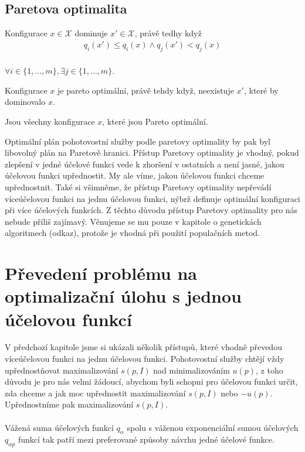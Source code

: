 \subsection{Paretova optimalita}

\begin{definice}[Dominance]
  Konfigurace $x \in \mathcal{X}$ dominuje $x' \in \mathcal{X}$, právě tedhy když
  \begin{align*}
    q_i(x') \leq q_i(x) \land q_j(x') < q_j(x)
  \end{align*}
  \\
$\forall i \in \{ 1, \dots, m \}, \exists j \in \{ 1, \dots, m \}$.
\\
\end{definice}

\begin{definice}
  Konfigurace $x$ je pareto optimální, právě tehdy když, neexistuje $x'$, které by dominovalo $x$.
  \\
\end{definice}

\begin{definice}
  Jsou všechny konfigurace $x$, které jsou Pareto optimální.
  \\
\end{definice}

Optimální plán pohotovostní služby podle paretovy optimality by pak byl libovolný plán na Paretově hranici.
Přístup Paretovy optimality je vhodný, pokud zlepšení v jedné účelové funkci vede k zhoršení v ostatních a není jasné, jakou účelovou funkci upřednostit.
My ale víme, jakou účelovou funkci chceme upřednostnit.
Také si všimněme, že přístup Paretovy optimality nepřevádí víceúčelovou funkci na jednu účelovou funkci,
nýbrž definuje optimální konfiguraci při více účelových funkcích. 
Z těchto důvodu přístup Paretovy optimality pro nás nebude příliš zajímavý.
Věnujeme se mu pouze v kapitole o genetickách algoritmech (odkaz), protože je vhodná při použití populačních metod.

\section{Převedení problému na optimalizační úlohu s jednou účelovou funkcí}

V předchozí kapitole jsme si ukázali několik přístupů, které vhodně převedou víceúčelovou funkci na jednu účelovou funkci.
Pohotovostní služby chtějí vždy upřednostňovat maximalizování $s(p, I)$ nad minimalizováním $u(p)$,
z toho důvodu je pro nás velmi žádoucí, abychom byli schopni pro účelovou funkci určit, zda chceme a jak moc upřednostit maximalizování $s(p, I)$ nebo $-u(p)$.
Upřednostníme pak maximalizování $s(p, I)$.
\\
\\
Vážená suma účelových funkcí $q_{\alpha}$ spolu s váženou exponenciální sumou účelových $q_{\alpha p}$ funkcí tak patří mezi preferované způsoby návrhu jedné účelové funkce.

